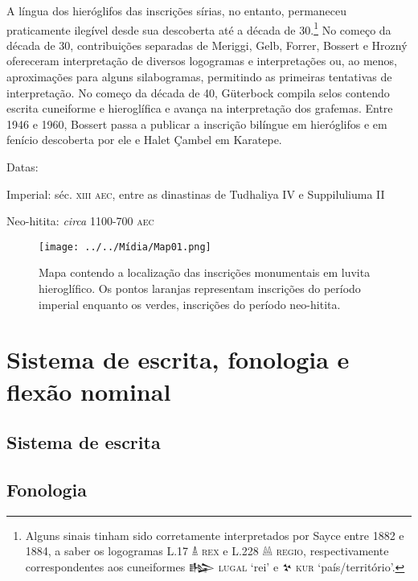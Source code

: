 \documentclass[a4paper,12pt]{memoir}
\begin{document}
A língua dos hieróglifos das inscrições sírias, no entanto, permaneceu
praticamente ilegível desde sua descoberta até a década de 30.\footnote{Alguns
	sinais tinham sido corretamente interpretados por Sayce entre 1882 e 1884, a
	saber os logogramas L.17 𔐑 \textsc{rex} e L.228 𔔆 \textsc{regio},
	respectivamente correspondentes aos cuneiformes \foreignlanguage{hittite}{𒈗}
	\textsc{lugal} `rei' e \foreignlanguage{hittite}{𒆳} \textsc{kur}
	`país\slash{}território'.}
No começo da década de 30, contribuições separadas de Meriggi, Gelb, Forrer,
Bossert e Hrozný ofereceram interpretação de diversos logogramas e
interpretações ou, ao menos, aproximações para alguns silabogramas,
permitindo as primeiras tentativas de interpretação.
No começo da década de 40, Güterbock compila selos contendo escrita cuneiforme e
hieroglífica e avança na interpretação dos grafemas.
Entre 1946 e 1960, Bossert passa a publicar a inscrição bilíngue em hieróglifos
e em fenício descoberta por ele e Halet Çambel em Karatepe.

\noindent Datas:
\begin{compactenum}
	\item Imperial: séc. \textsc{xiii aec}, entre as dinastinas de Tudhaliya IV e
	Suppiluliuma II
	\item Neo-hitita: \emph{circa} 1100-700 \textsc{aec}
\end{compactenum}

\begin{figure}[ht!]
	\begin{center}
		\texttt{[image: ../../Mídia/Map01.png]}
	\end{center}
	\caption{Mapa contendo a localização das inscrições monumentais em luvita
		hieroglífico. Os pontos laranjas representam inscrições do período imperial
		enquanto os verdes, inscrições do período neo-hitita.}\label{fig:mapa1}
\end{figure}

\chapter{Sistema de escrita, fonologia e flexão nominal}

\section{Sistema de escrita}

\lipsum[4]

\section{Fonologia}
\end{document}

